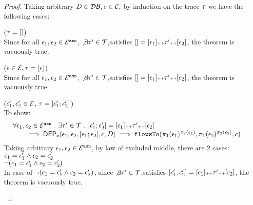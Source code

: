 %
\begin{proof}
  Taking arbitrary $D \in \mathcal{DB} , c \in \mathcal{C},$ by induction on the trace $\mathtt{\tau}$ we have the following cases:
  \begin{case}($\mathtt{\tau} = {[]}$)
    \\
    Since for all $\mathtt{\epsilon}_1, \mathtt{\epsilon}_2 \in \mathcal{E}^{\mathtt{{asn}}}$,
     $\not\exists \mathtt{\tau}' \in \mathcal{T}$,satisfies $
    {[]}  = [\mathtt{\epsilon}_1] {\scriptscriptstyle ++} \mathtt{\tau}' {\scriptscriptstyle ++} [\mathtt{\epsilon}_2]$, the theorem is vacuously true.
    \end{case}
    \begin{case}($\mathtt{\epsilon} \in \mathcal{E}, \mathtt{\tau} = [\mathtt{\epsilon}]$)
    \\
    Since for all $\mathtt{\epsilon}_1, \mathtt{\epsilon}_2 \in \mathcal{E}^{\mathtt{{asn}}}$,
     $\not\exists \mathtt{\tau}' \in \mathcal{T}$,satisfies $
    {[]} = [\mathtt{\epsilon}_1] {\scriptscriptstyle ++} \mathtt{\tau}' {\scriptscriptstyle ++} [\mathtt{\epsilon}_2]$, the theorem is vacuously true.
    \end{case}
    \begin{case}
      \label{case:soundness_basecase}
      ($\mathtt{\epsilon}_1', \mathtt{\epsilon}_2' \in \mathcal{E} $, $\mathtt{\tau} = [\mathtt{\epsilon}_1'; \mathtt{\epsilon}_2']$)
      \\
      To show:
      \[
      \begin{array}{l}
        \forall \mathtt{\epsilon}_1, \mathtt{\epsilon}_2 \in \mathcal{E}^{\mathtt{{asn}}}  ~.~
        \exists \mathtt{\tau}' \in \mathcal{T}  ~.~ [\mathtt{\epsilon}_1'; \mathtt{\epsilon}_2'] = [\mathtt{\epsilon}_1] {\scriptscriptstyle ++} \mathtt{\tau}' {\scriptscriptstyle ++} [\mathtt{\epsilon}_2]
        \\ \qquad 
            \implies    
          \mathsf{DEP_{\mathtt{e}}}(\mathtt{\epsilon}_1, \mathtt{\epsilon}_2, [\mathtt{\epsilon}_1; \mathtt{\epsilon}_2], c, D)
         \implies \mathtt{flowsTo}(\pi_1(\mathtt{\epsilon}_1)^{\pi_2(\mathtt{\epsilon}_1)}, \pi_1(\mathtt{\epsilon}_2)^{\pi_2(\mathtt{\epsilon}_2)}, c)
      \end{array}
      \]
      Taking arbitrary $ \mathtt{\epsilon}_1, \mathtt{\epsilon}_2 \in \mathcal{E}^{\mathtt{{asn}}}$, by law of excluded middle, there are 2 cases:
      \\
      $\mathtt{\epsilon}_1 = \mathtt{\epsilon}_1' \land  \mathtt{\epsilon}_2 = \mathtt{\epsilon}_2'$
      \\
      $\neg(\mathtt{\epsilon}_1 = \mathtt{\epsilon}_1' \land  \mathtt{\epsilon}_2 = \mathtt{\epsilon}_2')$
      \\
      In case of $\neg(\mathtt{\epsilon}_1 = \mathtt{\epsilon}_1' \land  \mathtt{\epsilon}_2 = \mathtt{\epsilon}_2')$, since 
      $\not\exists \mathtt{\tau}' \in \mathcal{T}$,satisfies $
      [\mathtt{\epsilon}_1'; \mathtt{\epsilon}_2'] = [\mathtt{\epsilon}_1] {\scriptscriptstyle ++} \mathtt{\tau}' {\scriptscriptstyle ++} [\mathtt{\epsilon}_2]$, 
      the theorem is vacuously true.

\end{case}
\end{proof}
